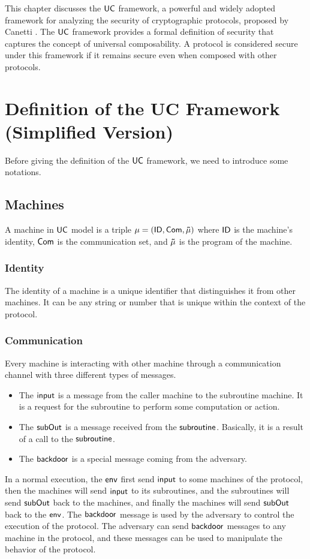 This chapter discusses the $\mathsf{UC}$ framework, a powerful and widely adopted framework for analyzing the security of cryptographic protocols, proposed by Canetti \cite{FOCS:Canetti01,JACM:Canetti20}. The $\mathsf{UC}$ framework provides a formal definition of security that captures the concept of universal composability. A protocol is considered secure under this framework if it remains secure even when composed with other protocols.

\section{Definition of the UC Framework (Simplified Version)}
Before giving the definition of the $\mathsf{UC}$ framework, we need to introduce some notations.

\subsection{Machines}
A machine in $\mathsf{UC}$ model is a triple $\mathsf{\mu} = ({\mathsf{ID}}, \mathsf{Com}, \mathsf{\tilde{\mu}})$ where ${\mathsf{ID}}$ is the machine's identity, $\mathsf{Com}$ is the communication set, and $\mathsf{\tilde{\mu}}$ is the program of the machine.
\subsubsection{Identity}
The identity of a machine is a unique identifier that distinguishes it from other machines. It can be any string or number that is unique within the context of the protocol.
\subsubsection{Communication}
Every machine is interacting with other machine through a communication channel with three different types of messages.
\begin{itemize}
    \item The $\mathsf{input}$ is a message from the caller machine to the subroutine machine. It is a request for the subroutine to perform some computation or action.
    \item The $\mathsf{subOut}$ is a message received from the $\mathsf{subroutine}$. Basically, it is a result of a call to the $\mathsf{subroutine}$.
    \item The $\mathsf{backdoor}$ is a special message coming from the adversary.
\end{itemize}

In a normal execution, the $\mathsf{env}$ first send $\mathsf{input}$ to some machines of the protocol, then the machines will send $\mathsf{input}$ to its subroutines, and the subroutines will send $\mathsf{subOut}$ back to the machines, and finally the machines will send $\mathsf{subOut}$ back to the $\mathsf{env}$. The $\mathsf{backdoor}$ message is used by the adversary to control the execution of the protocol. The adversary can send $\mathsf{backdoor}$ messages to any machine in the protocol, and these messages can be used to manipulate the behavior of the protocol. 
